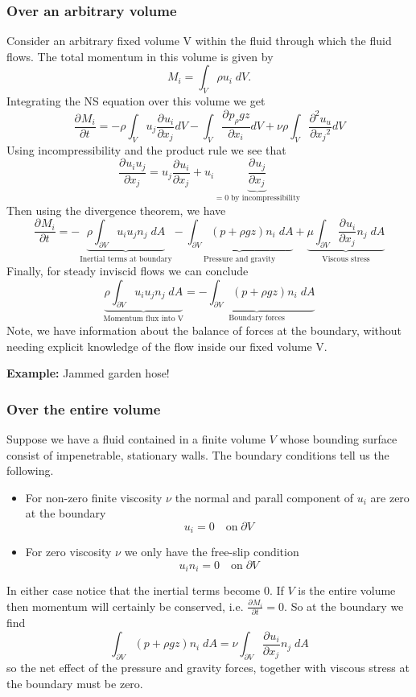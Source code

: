 \documentclass[11pt]{article}
\newcommand*{\pd}[3][]{\ensuremath{\frac{\partial^{#1} {#2}}{\partial {#3}^{#1}}}}
\newenvironment{eg}
{\begin{mdframed}[backgroundcolor=mylg, roundcorner=5pt, linewidth=0pt]\textbf{Example: }\normalfont}
    {\end{mdframed}}
\begin{document}
\subsubsection{Over an arbitrary volume}
Consider an arbitrary fixed volume V within the fluid through which the fluid flows.
The total momentum in this volume is given by
$$M_i=\int_V \rho u_i\;dV.$$
Integrating the NS equation over this volume we get
$$\pd{M_i}{t}=-\rho\int_V u_j\pd{u_i}{x_j}dV-\int_V\pd{p_\rho gz}{x_i}dV + \nu\rho\int_V \pd[2]{u_u}{x_j}dV$$
Using incompressibility and the product rule we see that
$$\pd{u_iu_j}{x_j}=u_j\pd{u_i}{x_j}+u_i\underbrace{\pd{u_j}{x_j}}_{=0 \;\text{by incompressibility}}$$
Then using the divergence theorem, we have
$$\pd{M_i}{t}=-\underbrace{\rho\int_{\partial V}u_iu_jn_j\;dA}_{\text{Inertial terms at boundary}}-\underbrace{\int_{\partial V}(p+\rho gz)n_i\;dA}_{\text{Pressure and gravity}}+\underbrace{\mu\int_{\partial V}\pd{u_i}{x_j}n_j\;dA}_{\text{Viscous stress}}$$
Finally, for steady inviscid flows we can conclude
$$\underbrace{\rho\int_{\partial V}u_iu_jn_j\;dA}_{\text{Momentum flux into V}}=\underbrace{-\int_{\partial V}(p + \rho gz)n_i\;dA}_{\text{Boundary forces}}$$
Note, we have information about the balance of forces at the boundary, without needing explicit knowledge of the flow inside our fixed volume V.
\begin{eg}
Jammed garden hose!
\end{eg}
\subsubsection{Over the entire volume}
Suppose we have a fluid contained in a finite volume $V$ whose bounding surface consist of impenetrable, stationary walls. The boundary conditions tell us the following.
\begin{itemize}
	\item For non-zero finite viscosity $\nu$ the normal and parall component of $u_i$ are zero at the boundary
		$$u_i=0\quad\text{on}\;\partial V$$
	\item For zero viscosity $\nu$ we only have the free-slip condition
		$$u_in_i=0\quad\text{on}\;\partial V$$
\end{itemize}
In either case notice that the inertial terms become 0.
If $V$ is the entire volume then momentum will certainly be conserved, i.e. $\pd{M_i}{t}=0$.
So at the boundary we find
$$\int_{\partial V}(p+\rho g z)n_i\;dA=\nu\int_{\partial V}\pd{u_i}{x_j}n_j\;dA$$
so the net effect of the pressure and gravity forces, together with viscous stress at the boundary must be zero.
\end{document}
